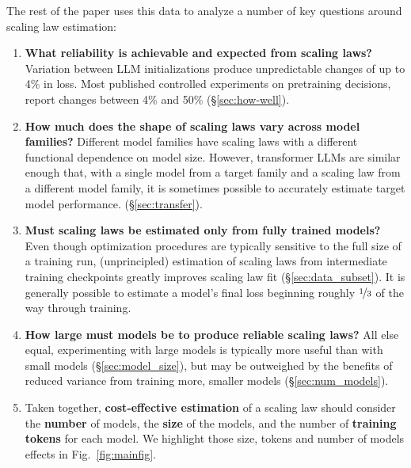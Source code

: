 \documentclass{article}
\theoremstyle{plain}
\theoremstyle{definition}
\theoremstyle{remark}
\begin{document}
The rest of the paper uses this data to analyze a number of key questions around scaling law estimation:
\begin{enumerate}[topsep=-3pt,itemsep=-0.3ex,partopsep=-1ex,parsep=1ex,leftmargin=\leftmargin-5pt]
    \item \textbf{What reliability is achievable and expected from scaling laws?} Variation between LLM initializations produce unpredictable changes of up to 4\% in loss. Most published controlled experiments on pretraining decisions, report changes between 4\% and 50\% (\S\ref{sec:how-well}).
    \item \textbf{How much does the shape of scaling laws vary across model families?} Different model families have scaling laws with a different functional dependence on model size. However, transformer LLMs are similar enough that, with a single model from a target family and a scaling law from a different model family,
    it is sometimes possible to accurately estimate target model performance. (\S\ref{sec:transfer}).
 \item \textbf{Must scaling laws be estimated only from fully trained models?} Even though optimization procedures are typically sensitive to the full size of a training run, (unprincipled) estimation of scaling laws from intermediate training checkpoints greatly improves scaling law fit (\S\ref{sec:data_subset}). It is generally possible to estimate a model's final loss beginning roughly $\nicefrac{1}{3}$ of the way through training.
 
 \item \textbf{How large must models be to produce reliable scaling laws?} All else equal, experimenting with large models is typically more useful than with small models (\S\ref{sec:model_size}), but may be outweighed by the benefits of reduced variance from training more, smaller models (\S\ref{sec:num_models}).
 
 \item Taken together, \textbf{cost-effective estimation} of a scaling law should consider the \textbf{number} of models, the \textbf{size} of the models, and the number of \textbf{training tokens} for each model. We highlight those size, tokens and number of models effects in Fig.~\ref{fig:mainfig}.
\end{enumerate}
\end{document}
